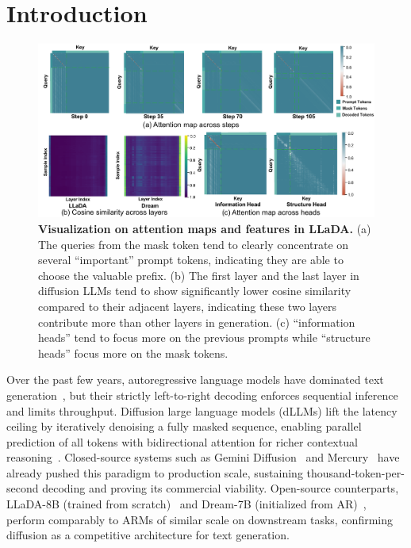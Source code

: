 \section{Introduction}

\begin{figure}[t]
  \centering
  \includegraphics[width=1.0\linewidth]{figure/intro.pdf}
  \caption{
  \textbf{Visualization on attention maps and features in LLaDA.}
    (a) The queries from the mask token tend to clearly concentrate on several ``important'' prompt tokens, indicating they are able to choose the valuable prefix. (b) The first layer and the last layer in diffusion LLMs tend to show significantly lower cosine similarity compared to their adjacent layers, indicating these two layers contribute more than other layers in generation. (c) ``information heads'' tend to focus more on the previous prompts while ``structure heads'' focus more on the mask tokens.
    }
  \label{fig:attention_map}
\end{figure}

Over the past few years, autoregressive language models have dominated text generation~\citep{zhao2023survey}, but their strictly left-to-right decoding enforces sequential inference and limits throughput. Diffusion large language models (dLLMs) lift the latency ceiling by iteratively denoising a fully masked sequence, enabling parallel prediction of all tokens with bidirectional attention for richer contextual reasoning~\citep{genimid,chen2025dpad, wang2025diffusion}. Closed-source systems such as Gemini Diffusion~\citep{genimid} and Mercury~\citep{khanna2025mercury} have already pushed this paradigm to production scale, sustaining thousand-token-per-second decoding and proving its commercial viability. Open-source counterparts, LLaDA-8B (trained from scratch)~\citep{nie2025large} and Dream-7B (initialized from AR)~\citep{ye2025dream}, perform comparably to ARMs of similar scale on downstream tasks, confirming diffusion as a competitive architecture for text generation.

